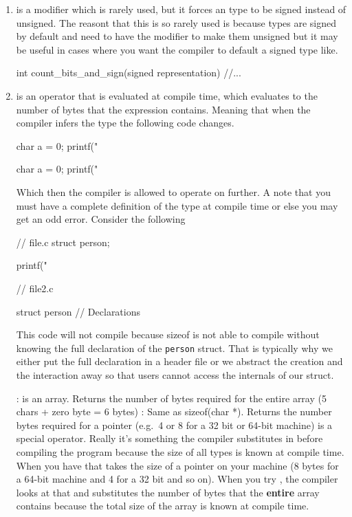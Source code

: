 \begin{enumerate}
\begin{code}[language=C]

\end{code}
\item {} is a modifier which is rarely used, but it forces an type to be signed instead of unsigned. The reasont that this is so rarely used is because types are signed by default and need to have the  modifier to make them unsigned but it may be useful in cases where you want the compiler to default a signed type like.

\begin{code}[language=C]
int count_bits_and_sign(signed representation) {
  //...
}
\end{code}
\item {} is an operator that is evaluated at compile time, which evaluates to the number of bytes that the expression contains. Meaning that when the compiler infers the type the following code changes.
\begin{code}[language=C]
char a = 0;
printf("%
\end{code}

\begin{code}[language=C]
char a = 0;
printf("%
\end{code}

Which then the compiler is allowed to operate on further. A note that you must have a complete definition of the type at compile time or else you may get an odd error. Consider the following
\\
\begin{code}[language=C]
// file.c
struct person;

printf("%

// file2.c

struct person {
  // Declarations
}
\end{code}

This code will not compile because sizeof is not able to compile  without knowing the full declaration of the \texttt{person} struct. That is typically why we either put the full declaration in a header file or we abstract the creation and the interaction away so that users cannot access the internals of our struct.

:  is an array. Returns the number of bytes required for the entire array (5 chars + zero byte = 6 bytes) : Same as sizeof(char *). Returns the number bytes required for a pointer (e.g.~4 or 8 for a 32 bit or 64-bit machine)  is a special operator. Really it's something the compiler substitutes in before compiling the program because the size of all types is known at compile time. When you have  that takes the size of a pointer on your machine (8 bytes for a 64-bit machine and 4 for a 32 bit and so on). When you try , the compiler looks at that and substitutes the number of bytes that the \textbf{entire} array contains because the total size of the array is known at compile time.


\end{enumerate}

